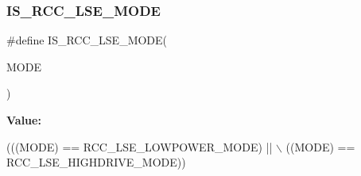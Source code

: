 \subsubsection{\texorpdfstring{I\+S\+\_\+\+R\+C\+C\+\_\+\+L\+S\+E\+\_\+\+M\+O\+DE}{IS\_RCC\_LSE\_MODE}}
{\footnotesize\ttfamily \#define I\+S\+\_\+\+R\+C\+C\+\_\+\+L\+S\+E\+\_\+\+M\+O\+DE(\begin{DoxyParamCaption}\item[{}]{M\+O\+DE }\end{DoxyParamCaption})}

{\bfseries Value\+:}
\begin{DoxyCode}
(((MODE) == RCC\_LSE\_LOWPOWER\_MODE) || \(\backslash\)
                                         ((MODE) == RCC\_LSE\_HIGHDRIVE\_MODE))
\end{DoxyCode}
